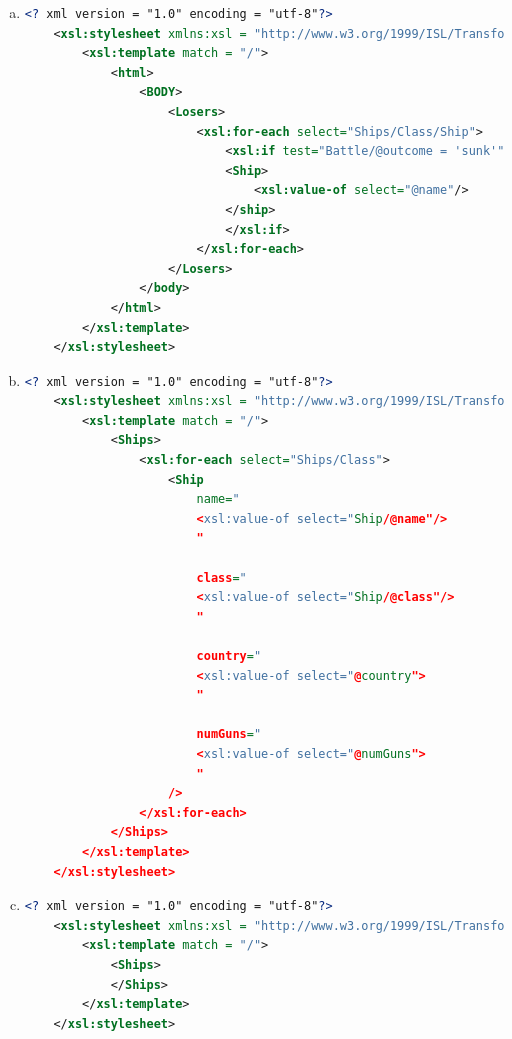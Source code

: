 \documentclass[12pt]{article}
\begin{document}
\begin{enumerate}[1.]
\begin{enumerate}[a)]
        \item

    \begin{lstlisting}[language=XML]
    <? xml version = "1.0" encoding = "utf-8"?>
    <xsl:stylesheet xmlns:xsl = "http://www.w3.org/1999/ISL/Transform">
        <xsl:template match = "/">
            <html>
                <BODY>
                    <Losers>
                        <xsl:for-each select="Ships/Class/Ship">
                            <xsl:if test="Battle/@outcome = 'sunk'">
                            <Ship>
                                <xsl:value-of select="@name"/>
                            </ship>
                            </xsl:if>
                        </xsl:for-each>
                    </Losers>
                </body>
            </html>
        </xsl:template>
    </xsl:stylesheet>
    \end{lstlisting}

        \item

    \begin{lstlisting}[language=XML]
    <? xml version = "1.0" encoding = "utf-8"?>
    <xsl:stylesheet xmlns:xsl = "http://www.w3.org/1999/ISL/Transform">
        <xsl:template match = "/">
            <Ships>
                <xsl:for-each select="Ships/Class">
                    <Ship
                        name="
                        <xsl:value-of select="Ship/@name"/>
                        "

                        class="
                        <xsl:value-of select="Ship/@class"/>
                        "

                        country="
                        <xsl:value-of select="@country">
                        "

                        numGuns="
                        <xsl:value-of select="@numGuns">
                        "
                    />
                </xsl:for-each>
            </Ships>
        </xsl:template>
    </xsl:stylesheet>
    \end{lstlisting}

        \item

    \begin{lstlisting}[language=XML]
    <? xml version = "1.0" encoding = "utf-8"?>
    <xsl:stylesheet xmlns:xsl = "http://www.w3.org/1999/ISL/Transform">
        <xsl:template match = "/">
            <Ships>
            </Ships>
        </xsl:template>
    </xsl:stylesheet>
    \end{lstlisting}
    \end{enumerate}
\end{enumerate}
\end{document}
